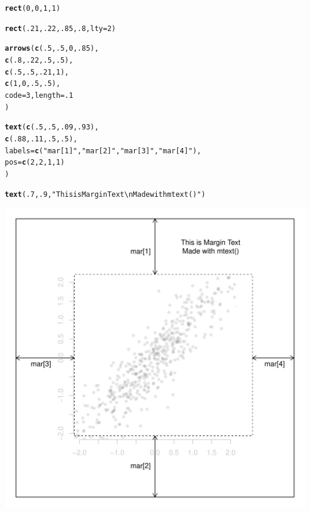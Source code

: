 \documentclass{tufte-book}\usepackage[]{graphicx}\usepackage[]{color}
\makeatletter
\def\maxwidth{ %
  \ifdim\Gin@nat@width>\linewidth
    \linewidth
  \else
    \Gin@nat@width
  \fi
}
\newcommand{\hlnum}[1]{\textcolor[rgb]{0.686,0.059,0.569}{#1}}%
\newcommand{\hlstr}[1]{\textcolor[rgb]{0.192,0.494,0.8}{#1}}%
\newcommand{\hlstd}[1]{\textcolor[rgb]{0.345,0.345,0.345}{#1}}%
\newcommand{\hlkwc}[1]{\textcolor[rgb]{0.333,0.667,0.333}{#1}}%
\newcommand{\hlkwd}[1]{\textcolor[rgb]{0.737,0.353,0.396}{\textbf{#1}}}%
\newenvironment{kframe}{%
 \def\at@end@of@kframe{}%
 \ifinner\ifhmode%
  \def\at@end@of@kframe{\end{minipage}}%
  \begin{minipage}{\columnwidth}%
 \fi\fi%
 \def\FrameCommand##1{\hskip\@totalleftmargin \hskip-\fboxsep
 \colorbox{shadecolor}{##1}\hskip-\fboxsep
     \hskip-\linewidth \hskip-\@totalleftmargin \hskip\columnwidth}%
 \MakeFramed {\advance\hsize-\width
   \@totalleftmargin\z@ \linewidth\hsize
   \@setminipage}}%
 {\par\unskip\endMakeFramed%
 \at@end@of@kframe}
\newenvironment{knitrout}{}{} %
\makeatother
\begin{document}
\begin{footnotesize}
\begin{marginfigure}
\begin{tiny}
\begin{knitrout}
\begin{kframe}
\begin{alltt}
\hlkwd{rect}\hlstd{(}\hlnum{0}\hlstd{,} \hlnum{0}\hlstd{,} \hlnum{1}\hlstd{,} \hlnum{1}\hlstd{)}

\hlkwd{rect}\hlstd{(}\hlnum{.21}\hlstd{,} \hlnum{.22}\hlstd{,} \hlnum{.85}\hlstd{,} \hlnum{.8}\hlstd{,} \hlkwc{lty} \hlstd{=} \hlnum{2}\hlstd{)}

\hlkwd{arrows}\hlstd{(}\hlkwd{c}\hlstd{(}\hlnum{.5}\hlstd{,} \hlnum{.5}\hlstd{,} \hlnum{0}\hlstd{,} \hlnum{.85}\hlstd{),}
       \hlkwd{c}\hlstd{(}\hlnum{.8}\hlstd{,} \hlnum{.22}\hlstd{,} \hlnum{.5}\hlstd{,} \hlnum{.5}\hlstd{),}
       \hlkwd{c}\hlstd{(}\hlnum{.5}\hlstd{,} \hlnum{.5}\hlstd{,} \hlnum{.21}\hlstd{,} \hlnum{1}\hlstd{),}
       \hlkwd{c}\hlstd{(}\hlnum{1}\hlstd{,} \hlnum{0}\hlstd{,} \hlnum{.5}\hlstd{,} \hlnum{.5}\hlstd{),}
       \hlkwc{code} \hlstd{=} \hlnum{3}\hlstd{,} \hlkwc{length} \hlstd{=} \hlnum{.1}
       \hlstd{)}

\hlkwd{text}\hlstd{(}\hlkwd{c}\hlstd{(}\hlnum{.5}\hlstd{,} \hlnum{.5}\hlstd{,} \hlnum{.09}\hlstd{,} \hlnum{.93}\hlstd{),}
     \hlkwd{c}\hlstd{(}\hlnum{.88}\hlstd{,} \hlnum{.11}\hlstd{,} \hlnum{.5}\hlstd{,} \hlnum{.5}\hlstd{),}
     \hlkwc{labels} \hlstd{=} \hlkwd{c}\hlstd{(}\hlstr{"mar[1]"}\hlstd{,} \hlstr{"mar[2]"}\hlstd{,} \hlstr{"mar[3]"}\hlstd{,} \hlstr{"mar[4]"}\hlstd{),}
     \hlkwc{pos} \hlstd{=} \hlkwd{c}\hlstd{(}\hlnum{2}\hlstd{,} \hlnum{2}\hlstd{,} \hlnum{1}\hlstd{,} \hlnum{1}\hlstd{)}
     \hlstd{)}

\hlkwd{text}\hlstd{(}\hlnum{.7}\hlstd{,} \hlnum{.9}\hlstd{,} \hlstr{"This is Margin Text\textbackslash{}nMade with mtext()"}\hlstd{)}
\end{alltt}
\end{kframe}
\includegraphics[width=\maxwidth]{figure/unnamed-chunk-179-1} 


\end{knitrout}
\end{tiny}
\end{marginfigure}
\end{footnotesize}
\end{document}
